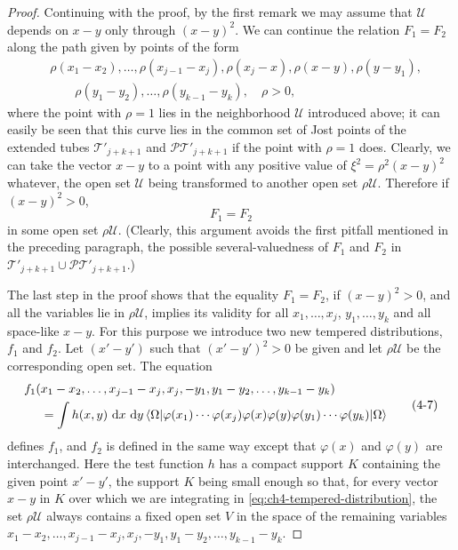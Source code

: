 \begin{proof}
Continuing with the proof, by the first remark we may assume that $\mathcal{U}$
depends on $x-y$ only through $(x-y)^2$. We can continue the relation
$F_1=F_2$ along the path given by points of the form
\begin{equation}
\begin{aligned}
 &\rho(x_1-x_2),\ldots,\rho(x_{j-1}-x_j),\rho(x_j-x),\rho(x-y),
   \rho(y-y_1),\\
 &\qquad\rho(y_1-y_2),\ldots,\rho(y_{k-1}-y_k),\quad \rho>0,
\end{aligned}
\tag{4-6}\label{eq:ch4-scaling-path}
\end{equation}
where the point with $\rho=1$ lies in the neighborhood $\mathcal{U}$ introduced
above; it can easily be seen that this curve lies in the common set of Jost
points of the extended tubes $\mathcal{T}'_{j+k+1}$ and
$\mathcal{P}\mathcal{T}'_{j+k+1}$ if the point with $\rho=1$ does. Clearly, we
can take the vector $x-y$ to a point with any positive value of
$\xi^2=\rho^2(x-y)^2$ whatever, the open set $\mathcal{U}$ being transformed
to another open set $\rho\mathcal{U}$. Therefore if $(x-y)^2>0$,
\begin{equation*}
F_1=F_2
\end{equation*}
in some open set $\rho\mathcal{U}$. (Clearly, this argument avoids the first
pitfall mentioned in the preceding paragraph, the possible several-valuedness
of $F_1$ and $F_2$ in $\mathcal{T}'_{j+k+1}\cup
\mathcal{P}\mathcal{T}'_{j+k+1}$.)

The last step in the proof shows that the equality $F_1=F_2$, if
$(x-y)^2>0$, and all the variables lie in $\rho\mathcal{U}$, implies its
validity for all $x_1,\ldots,x_j$, $y_1,\ldots,y_k$ and all space-like $x-y$.
For this purpose we introduce two new tempered distributions, $f_1$ and
$f_2$. Let $(x'-y')$ such that $(x'-y')^2>0$ be given and let
$\rho\mathcal{U}$ be the corresponding open set. The equation
\begin{equation}
\begin{aligned}
 f_1(&x_1-x_2,\ldots,x_{j-1}-x_j,x_j,-y_1,
      y_1-y_2,\ldots,y_{k-1}-y_k) \\
 &=\int h(x,y)\,\mathop{}\!\mathrm{d} x\,\mathop{}\!\mathrm{d} y\,
   \langle \Omega\rvert\varphi(x_1)\cdots\varphi(x_j)\varphi(x)\varphi(y)
   \varphi(y_1)\cdots\varphi(y_k)\lvert \Omega\rangle
\end{aligned}
\tag{4-7}\label{eq:ch4-tempered-distribution}
\end{equation}
defines $f_1$, and $f_2$ is defined in the same way except that
$\varphi(x)$ and $\varphi(y)$ are interchanged. Here the test function $h$ has
a compact support $K$ containing the given point $x'-y'$, the support $K$ being
small enough so that, for every vector $x-y$ in $K$ over which we are
integrating in \eqref{eq:ch4-tempered-distribution}, the set $\rho\mathcal{U}$ always contains a fixed open
set $V$ in the space of the remaining variables
$x_1-x_2,\ldots,x_{j-1}-x_j,x_j,-y_1,y_1-y_2,\ldots,y_{k-1}-y_k$.


\end{proof}
